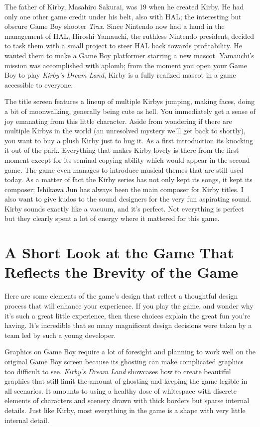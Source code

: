 \documentclass{book}
\begin{document}
The father of Kirby, Masahiro Sakurai, was 19 when he created Kirby. He had only one other game credit under his belt, also with HAL; the interesting but obscure Game Boy shooter \emph{Trax}. Since Nintendo now had a hand in the management of HAL, Hiroshi Yamauchi, the ruthless Nintendo president, decided to task them with a small project to steer HAL back towards profitability. He wanted them to make a Game Boy platformer starring a new mascot. Yamauchi’s mission was accomplished with aplomb; from the moment you open your Game Boy to play \emph{Kirby’s Dream Land}, Kirby is a fully realized mascot in a game accessible to everyone.\par
The title screen features a lineup of multiple Kirbys jumping, making faces, doing a bit of moonwalking, generally being cute as hell. You immediately get a sense of joy emanating from this little character. Aside from wondering if there are multiple Kirbys in the world (an unresolved mystery we’ll get back to shortly), you want to buy a plush Kirby just to hug it. As a first introduction its knocking it out of the park. Everything that makes Kirby lovely is there from the first moment except for its seminal copying ability which would appear in the second game. The game even manages to introduce musical themes that are still used today. As a matter of fact the Kirby series has not only kept its songs, it kept its composer; Ishikawa Jun has always been the main composer for Kirby titles. I also want to give kudos to the sound designers for the very fun aspirating sound. Kirby sounds exactly like a vacuum, and it’s perfect. Not everything is perfect but they clearly spent a lot of energy where it mattered for this game.\par
\FloatBarrier\section*{A Short Look at the Game That Reflects the Brevity of the Game}
Here are some elements of the game’s design that reflect a thoughtful design process that will enhance your experience. If you play the game, and wonder why it’s such a great little experience, then these choices explain the great fun you’re having. It’s incredible that so many magnificent design decisions were taken by a team led by such a young developer.\par
Graphics on Game Boy require a lot of foresight and planning to work well on the original Game Boy screen because its ghosting can make complicated graphics too difficult to see. \emph{Kirby’s Dream Land} showcases how to create beautiful graphics that still limit the amount of ghosting and keeping the game legible in all scenarios. It amounts to using a healthy dose of whitespace with discrete elements of characters and scenery drawn with thick borders but sparse internal details. Just like Kirby, most everything in the game is a shape with very little internal detail.\par
\end{document}
